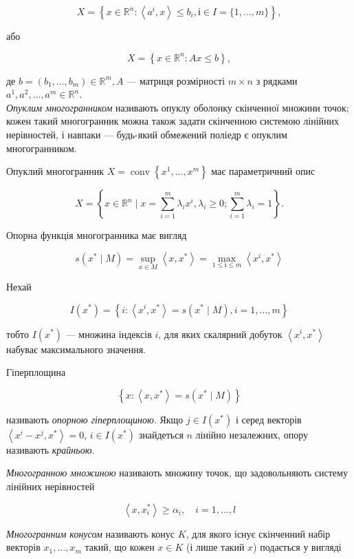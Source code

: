\documentclass[12pt,a4paper]{extarticle}
\numberwithin{section}{part}
\begin{document}
$$
X=\left\{x \in \mathbb{R}^{n}:\left\langle a^{i}, x\right\rangle \leq b_{i}, і \in I=\{1, \ldots, m\}\right\},
$$

або

$$
X=\left\{x \in \mathbb{R}^{n}: A x \leq b\right\},
$$

де $b=\left(b_{1}, \ldots, b_{m}\right) \in \mathbb{R}^{m}, A$ --- матриця розмірності $m \times n$ з рядками $a^{1}, a^{2}, \ldots, a^{m} \in \mathbb{R}^{n}$.\\
\textit{Опуклим многогранником} називають опуклу оболонку скінченної множини точок; кожен такий многогранник можна також задати скінченною системою лінійних нерівностей, і навпаки --- будь-який обмежений поліедр є опуклим многогранником.

Опуклий многогранник $X=\operatorname{conv}\left\{x^{1}, \ldots, x^{m}\right\}$ має параметричний опис

$$
X=\left\{x \in \mathbb{R}^{n} \mid x=\sum_{i=1}^{m} \lambda_{i} x^{i}, \lambda_{i} \geq 0 ; \sum_{i=1}^{m} \lambda_{i}=1\right\} .
$$

Опорна функція многогранника має вигляд

$$
s\left(x^{*} \mid M\right)=\sup _{x \in M}\left\langle x, x^{*}\right\rangle=\max _{1 \leq і \leq m}\left\langle x^{i}, x^{*}\right\rangle
$$

Нехай

$$
I\left(x^{*}\right)=\left\{i:\left\langle x^{i}, x^{*}\right\rangle=s\left(x^{*} \mid M\right), i=1, \ldots, m\right\}
$$

тобто $I\left(x^{*}\right)$ --- множина індексів $i$, для яких скалярний добуток $\left\langle x^{i}, x^{*}\right\rangle$ набуває максимального значення.

Гіперплощина

$$
\left\{x:\left\langle x, x^{*}\right\rangle=s\left(x^{*} \mid M\right)\right\}
$$

називають \textit{опорною гіперплощиною}. Якщо $j \in I\left(x^{*}\right)$ і серед векторів $\left\langle x^{i}-x^{j}, x^{*}\right\rangle=0$, $i \in I\left(x^{*}\right)$ знайдеться $n$ лінійно незалежних, опору називають \textit{крайньою}.

\textit{Многогранною множиною} називають множину точок, що задовольняють систему лінійних нерівностей

$$
\left\langle x, x_{i}^{*}\right\rangle \geq \alpha_{i}, \quad i=1, \ldots, l
$$

\textit{Многогранним конусом} називають конус $K$, для якого існує скінченний набір векторів $x_{1}, \ldots, x_{m}$ такий, що кожен $x \in K$ (і лише такий $x$) подається у вигляді
\end{document}
